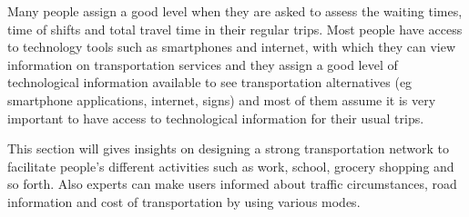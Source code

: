 \documentclass[
11pt, %
oneside, %
english, %
singlespacing, %
]{macthesis} %
\begin{document}
Many people assign a good level when they are asked to assess the waiting times, time of shifts and total travel time in their regular trips. Most people have access to technology tools such as smartphones and internet, with which they can view information on transportation services and they assign a good level of technological information available to see transportation alternatives (eg smartphone applications, internet, signs) and most of them assume it is very important to have access to technological information for their usual trips.

This section will gives insights on designing a strong transportation network to facilitate people's different activities such as work, school, grocery shopping and so forth. Also experts can make users informed about traffic circumstances, road information and cost of transportation by using various modes.
\end{document}
